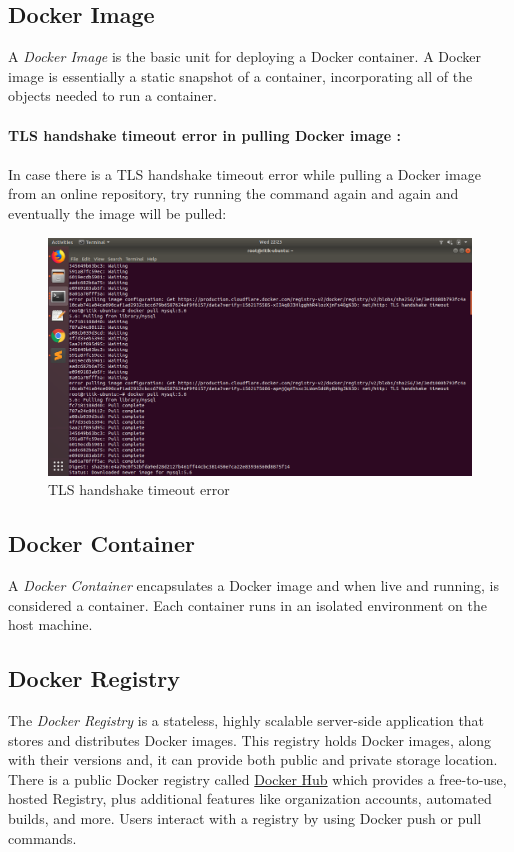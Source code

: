 \documentclass[12pt]{report}
\begin{document}
\subsection{Docker Image}
A \textit{Docker Image} is the basic unit for deploying a Docker container. A Docker image is essentially a static snapshot of a container, incorporating all of the objects needed to run a container.\\\\
\textbf{TLS handshake timeout error in pulling Docker image :}\\\\
In case there is a TLS handshake timeout error while pulling a Docker image from an online repository, try running the command again and again and eventually the image will be pulled:
\begin{figure}[h!]
	\begin{center}
		\includegraphics[totalheight=0.4\textheight]{TLS}
		\caption{TLS handshake timeout error}
	\end{center}
\end{figure} 
\subsection{Docker Container}
A \textit{Docker Container} encapsulates a Docker image and when live and running, is considered a container. Each container runs in an isolated environment on the host machine.
\subsection{Docker Registry}
The \textit{Docker Registry} is a stateless, highly scalable server-side application that stores and distributes Docker images. This registry holds Docker images, along with their versions and, it can provide both public and private storage location. There is a public Docker registry called \href{https://hub.docker.com/}{Docker Hub}\cite{Dockerhub} which provides a free-to-use, hosted Registry, plus additional features like organization accounts, automated builds, and more. Users interact with a registry by using Docker push or pull commands.
\end{document}
